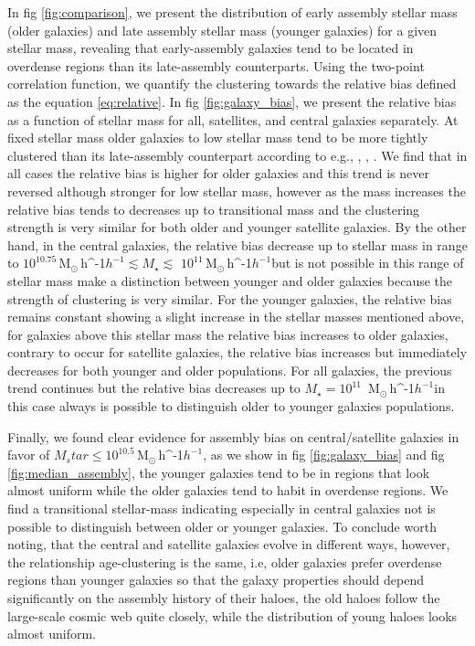 \documentclass[a4paper,fleqn,usenatbib]{mnras}
\newcommand{\Msunh}{\,{\rm M}$_{\odot}$\,\ifmmode h^{-1}\else $h^{-1}$\fi}
\begin{document}
In fig \ref{fig:comparison}, we present the distribution of early assembly stellar mass (older galaxies) and late assembly stellar mass (younger galaxies) for a given stellar mass, revealing that early-assembly galaxies tend to be located in overdense regions than its late-assembly counterparts. 
Using the two-point correlation function, we quantify the clustering towards the relative bias defined as the equation \ref{eq:relative}. In fig \ref{fig:galaxy_bias}, we present the relative bias as a function of stellar mass for all, satellites, and central galaxies separately. At fixed stellar mass older galaxies to low stellar mass tend to be more tightly clustered than its late-assembly counterpart according to e.g., \citep{Lacerna_2014}, \citep{2013MNRAS.433..515W}, \citep{2009MNRAS.394.2229Z}. We find that in all cases the relative bias is higher for older galaxies and this trend is never reversed although stronger for low stellar mass, however as the mass increases the relative bias tends to decreases up to transitional mass and the clustering strength is very similar for both older and younger satellite galaxies.
By the other hand, in the central galaxies, the relative bias decrease up to stellar mass in range to $10^{10.75}$\Msunh $\lesssim M_\star \lesssim$ $10^{11}$\Msunh but is not possible in this range of stellar mass make a distinction between younger and older galaxies because the strength of clustering is very similar. 
For the younger galaxies, the relative bias remains constant showing a slight increase in the stellar masses mentioned above, for galaxies above this stellar mass the relative bias increases to older galaxies, contrary to occur for satellite galaxies, the relative bias increases but immediately decreases for both younger and older populations. For all galaxies, the previous trend continues but the relative bias decreases up to $M_\star = 10^{11}$ \Msunh in this case always is possible to distinguish older to younger galaxies populations.

Finally, we found clear evidence for assembly bias on central/satellite galaxies in favor of $M_star \leq 10^{10.5}$\Msunh, as we show in fig \ref{fig:galaxy_bias} and fig \ref{fig:median_assembly}, the younger galaxies tend to be in regions that look almost uniform while the older galaxies tend to habit in overdense regions. We find a transitional stellar-mass indicating especially in central galaxies not is possible to distinguish between older or younger galaxies. 
To conclude worth noting, that the central and satellite galaxies evolve in different ways, however, the relationship age-clustering is the same, i.e, older galaxies prefer overdense regions than younger galaxies so that the galaxy properties should depend significantly on the assembly history of their haloes, the old haloes follow the large-scale cosmic web quite closely, while the distribution of young haloes looks almost uniform.
\end{document}
